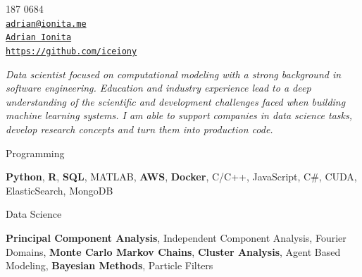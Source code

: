 \documentclass[11pt,article,oneside]{memoir}
\makeatletter
\def\myauthor{Adrian Ionita}
\def\myemail{adrian@ionita.me}
\def\myweb{https://github.com/iceiony}
\def\myphone{0797 187 0684}
\def\mytwitter{@iceiony}
\def\mylinkedin{https://uk.linkedin.com/in/adrian-ionita-6a923129}
\makeatother
\begin{document}
%
\hfill
\begin{minipage}[t]{1.3in}
  \flushright \footnotesize  \contactblock \myphone \, \faPhone \\ 
  {\scriptsize  \texttt{\href{mailto:\myemail}{\myemail}} \, \faEnvelope} \\
  {\scriptsize  \texttt{\href{\mylinkedin}{\myauthor}} \, \faLinkedinSquare }  \\ 
  {\scriptsize  \texttt{\href{\myweb}{\myweb}} \, \faGithub}
\end{minipage}

{\vskip -0.8cm}
\reversemarginpar

\bigskip      
\medskip

\noindent\emph{Data scientist focused on computational modeling with a strong background in software engineering.
Education and industry experience lead to a deep understanding of the scientific and development challenges faced when building machine learning systems.
I am able to support companies in data science tasks, develop research concepts and turn them into production code.
}
\bigskip


\ind Programming

\ind \hspace{0.354in} \footnotesize \textbf{Python}, \textbf{R}, \textbf{SQL}, MATLAB, \textbf{AWS}, \textbf{Docker}, C/C++, JavaScript, C\#, CUDA, ElasticSearch, MongoDB \normalsize 

\ind Data Science

\ind \hspace{0.354in} \footnotesize \textbf{Principal Component Analysis}, Independent Component Analysis, Fourier Domains,
\textbf{Monte Carlo Markov Chains}, \textbf{Cluster Analysis}, Agent Based Modeling, \textbf{Bayesian Methods}, Particle Filters \normalsize
\end{document}
